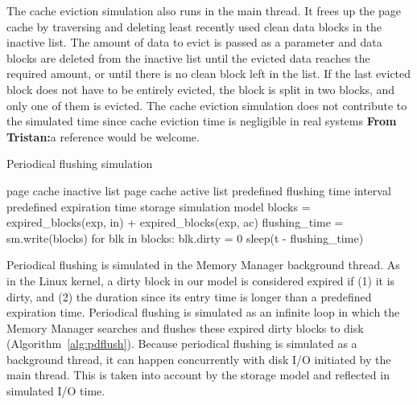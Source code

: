 \documentclass[conference]{IEEEtran}
\newcommand{\Desc}[2]{\State \makebox[2em][l]{#1}#2}
\newcommand{\tristan}[1]{\color{orange}\textbf{From Tristan:}#1\color{black}}
\begin{document}
    The cache eviction simulation also runs in
    the main thread. It frees up the page cache by traversing and deleting 
    least recently used clean data blocks in the inactive list.
    The amount of data to evict is passed as a parameter and data blocks are deleted 
    from the inactive list until the evicted data reaches the required amount,
    or until there is no clean block left in the list.
    If the last evicted block does not have to be entirely evicted, the block is split in two blocks,
    and only one of them is evicted.
    The cache eviction simulation does not contribute to the simulated time 
    since cache eviction time is negligible in real systems \tristan{a reference would be welcome}.
    
    \begin{algorithm}\caption{Periodical flushing simulation}\label{alg:pdflush}
        \small
        \begin{algorithmic}[1]
            \Input
                \Desc{in}{page cache inactive list}
                \Desc{ac}{page cache active list}
                \Desc{t}{predefined flushing time interval}
                \Desc{exp}{predefined expiration time}
                \Desc{sm}{storage simulation model}
               \EndInput
                \State blocks = expired\_blocks(exp, in) + expired\_blocks(exp, ac) 
                \State flushing\_time = sm.write(blocks)
                \State for blk in blocks: blk.dirty = 0
                    \State sleep(t - flushing\_time)
                \EndIf  %
            \EndWhile
        \end{algorithmic}
    \end{algorithm}

    Periodical flushing is simulated in the Memory Manager
    background thread. As in the Linux kernel, a dirty block
    in our model is considered expired if (1) it is dirty, and (2)
    the duration since its entry time is longer than a
    predefined expiration time. 
    Periodical flushing is simulated as an infinite loop in which 
    the Memory Manager searches and flushes these expired dirty blocks to disk (Algorithm~\ref{alg:pdflush}). 
    Because periodical flushing is simulated as a background thread, it can happen concurrently
    with disk I/O initiated by the main thread. This is taken into account by the 
    storage model and reflected in simulated I/O time.
\end{document}
